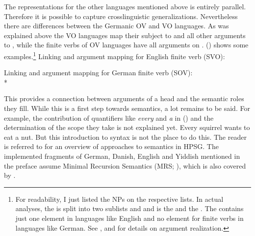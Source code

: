 The representations for the other languages mentioned above is entirely parallel. Therefore it is
possible to capture crosslinguistic generalizations. Nevertheless there are differences between the
Germanic OV and VO languages. As was explained above the VO languages map their subject to \spr and
all other arguments to \comps, while the finite verbs of OV languages have all arguments on \comps. 
() shows some examples.\footnote{%
 For readability, I just listed the NPs on the respective lists. In
actual analyses, the \argstl is split into two sublists  and  and  is the
\sprl and  the \compsl. The \sprl contains just one element in languages like English and no
element for finite verbs in languages like German.
  See ,  and  for details on argument realization.
}
\eal
\ex Linking and argument mapping for English finite verb (SVO):\\

\ex Linking and argument mapping for German finite verb (SOV):\\*
\zl

This provides a connection between arguments of a head and the semantic roles they fill. While this
is a first step towards semantics, a lot remains to be said. For example, the contribution of
quantifiers like \emph{every} and \emph{a} in () and the determination of the scope they take is not explained yet. 
\ea
Every squirrel wants to eat a nut.
\z
But this introduction to syntax is not the place to do this. The reader is referred to
 for an overview of approaches to semantics in HPSG. The implemented fragments of
German, Danish, English and Yiddish mentioned in the preface assume Minimal Recursion Semantics (MRS; \citealt{CFPS2005a}), which is
also covered by \citet[Section~6.1]{KoenigRichter2021a}.


